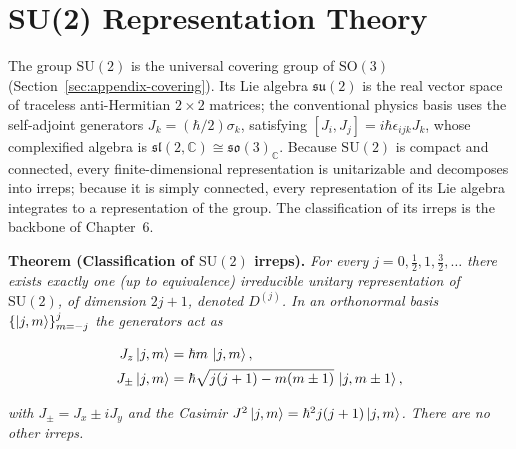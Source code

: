 \section{SU(2) Representation Theory}
\label{sec:appendix-su2-reps}

The group $\mathrm{SU}(2)$ is the universal covering group of $\mathrm{SO}(3)$ (Section~\ref{sec:appendix-covering}). Its Lie algebra $\mathfrak{su}(2)$ is the real vector space of traceless anti-Hermitian $2\times2$ matrices; the conventional physics basis uses the self-adjoint generators $J_{k}=(\hbar/2)\sigma_{k}$, satisfying $[J_{i},J_{j}]=i\hbar\epsilon_{ijk}J_{k}$, whose complexified algebra is $\mathfrak{sl}(2,\mathbb C)\cong\mathfrak{so}(3)_{\mathbb C}$. Because $\mathrm{SU}(2)$ is compact and connected, every finite-dimensional representation is unitarizable and decomposes into irreps; because it is simply connected, every representation of its Lie algebra integrates to a representation of the group. The classification of its irreps is the backbone of Chapter~6.

\medskip\noindent\textbf{Theorem (Classification of $\mathrm{SU}(2)$ irreps).} \emph{For every $j=0,\tfrac12,1,\tfrac32,\ldots$ there exists exactly one (up to equivalence) irreducible unitary representation of $\mathrm{SU}(2)$, of dimension $2j+1$, denoted $D^{(j)}$. In an orthonormal basis $\{\ket{j,m}\}_{m=-j}^{j}$ the generators act as}
\begin{linenomath}
\begin{align}
J_{z}\ket{j,m} &= \hbar m\,\ket{j,m}, \label{eq:su2-jz}\\
J_{\pm}\ket{j,m} &= \hbar\sqrt{j(j+1)-m(m\pm1)}\,\ket{j,m\pm1}, \label{eq:su2-jpm}
\end{align}
\end{linenomath}
\emph{with $J_{\pm}=J_{x}\pm iJ_{y}$ and the Casimir $J^{2}\ket{j,m}=\hbar^{2}j(j+1)\ket{j,m}$. There are no other irreps.}

